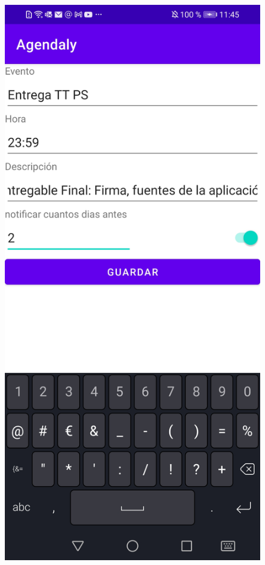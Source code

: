 \documentclass[a4paper,openright,12pt]{article}
\begin{document}
\begin{figure}
            \includegraphics[scale=0.05]{calendar3.jpg} \hfill

\end{figure}
\end{document}
